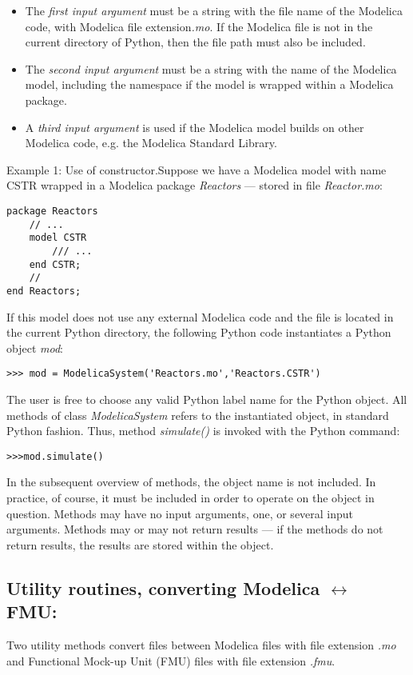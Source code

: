 \begin{itemize}
	\item The \textit{first input argument} must be a string with the file name of the Modelica code, with Modelica file extension\textit{.mo}. If the 	 
	       Modelica file is not in the current directory of Python, then the file path must also be included.
	\item The \textit{second input argument} must be a string with the name of the Modelica model, including the namespace if the model is wrapped 
		  within a Modelica package.
	\item A \textit{third input argument} is used if the Modelica model builds on other Modelica code, e.g. the Modelica Standard Library.
\end{itemize}

Example 1: Use of constructor.Suppose we have a Modelica model with name CSTR wrapped in a Modelica package \textit{Reactors} — stored in file
\textit{Reactor.mo}:

\begin{lstlisting}
package Reactors
	// ...
	model CSTR
		/// ...
	end CSTR;
	//
end Reactors;
\end{lstlisting}

If this model does not use any external Modelica code and the file is located in the current Python directory, the following
Python code instantiates a Python object \textit{mod}:

\begin{lstlisting}
>>> mod = ModelicaSystem('Reactors.mo','Reactors.CSTR')
\end{lstlisting}

The user is free to choose any valid Python label name for the Python object. All methods of class \textit{ModelicaSystem} refers to the instantiated object, in standard Python fashion. Thus, method \textit{simulate()} is invoked with the Python command:

\begin{lstlisting}
>>>mod.simulate()
\end{lstlisting}

In the subsequent overview of methods, the object name is not included. In practice, of course, it must be included in order
to operate on the object in question. Methods may have no input arguments, one, or several input arguments. Methods may or may not return results — if the methods do not return results, the results are stored within the object.

\subsection{Utility routines, converting Modelica $\leftrightarrow$ FMU:}
\label{subsec:pythonmodelicafmu}
Two utility methods convert files between Modelica files with file extension \textit{.mo} and Functional Mock-up Unit (FMU) files with
file extension \textit{.fmu}.

